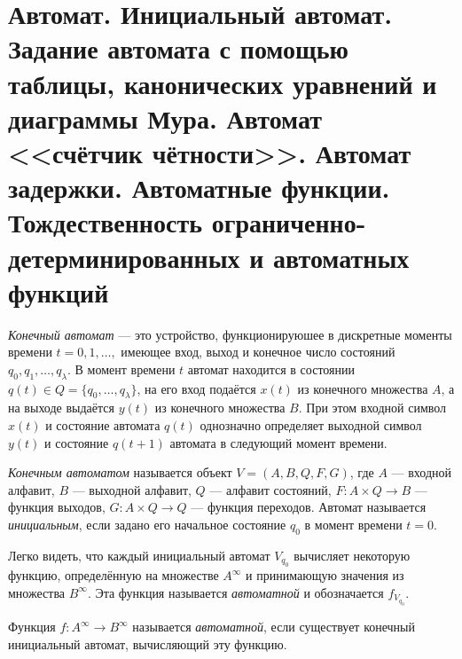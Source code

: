 \section{Автомат. Инициальный автомат. Задание автомата с помощью таблицы, канонических уравнений и диаграммы Мура. Автомат <<счётчик чётности>>. Автомат задержки. Автоматные функции. Тождественность ограниченно-детерминированных и автоматных функций}

\textit{Конечный автомат} --- это устройство, функционируюшее в дискретные моменты времени $t = 0, 1, \ldots,$ имеющее вход, выход и конечное число состояний $q_0, q_1, \ldots, q_{\lambda}$. В момент времени $t$ автомат находится в состоянии $q(t)\in Q = \{q_0, \ldots, q_{\lambda}\}$, на его вход подаётся $x(t)$ из конечного множества $A$, а на выходе выдаётся $y(t)$ из конечного множества $B$. При этом входной символ $x(t)$ и состояние автомата $q(t)$ однозначно определяет выходной символ $y(t)$ и состояние $q(t+1)$ автомата в следующий момент времени.

\begin{definition}
    \textit{Конечным автоматом} называется объект $V=(A, B, Q, F, G)$, где $A$ --- входной алфавит, $B$ --- выходной алфавит, $Q$ --- алфавит состояний, $F:A\times Q \to B$ --- функция выходов, $G:A\times Q \to Q$ --- функция переходов. Автомат называется \textit{инициальным}, если задано его начальное состояние $q_0$ в момент времени $t=0$.
\end{definition}

Легко видеть, что каждый инициальный автомат $V_{q_0}$ вычисляет некоторую функцию, определённую на множестве $A^{\infty}$ и принимающую значения из множества $B^{\infty}$. Эта функция называется \textit{автоматной} и обозначается $f_{V_{q_0}}$.

\begin{definition}
    Функция $f:A^{\infty} \to B^{\infty}$ называется \textit{автоматной}, если существует конечный инициальный автомат, вычисляющий эту функцию.
\end{definition}

